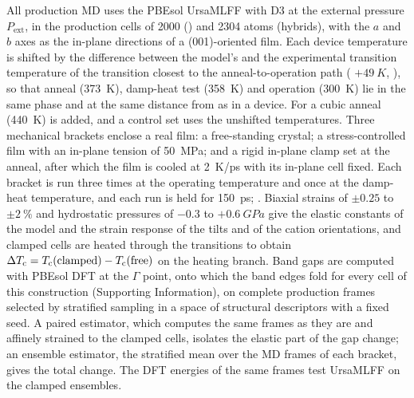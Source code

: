{All production MD uses the PBEsol UrsaMLFF with D3 at the external pressure $P_\mathrm{ext}$, in
the production cells of 2000 (\CsSnI{}) and 2304 atoms (hybrids), with the $a$ and $b$ axes as the
in-plane directions of a (001)-oriented film. Each device temperature is shifted by the difference
between the model's and the experimental transition temperature of the transition closest to the
anneal-to-operation path (\CsSnI{} $+\SI{49}{K}$, ),
so that anneal (\SI{373}{K}), damp-heat test (\SI{358}{K}) and operation (\SI{300}{K}) lie in the
same phase and at the same distance from \Tc{} as in a device.  For \CsSnI{} a cubic anneal
(\SI{440}{K}) is added, and a control set uses the unshifted temperatures. Three mechanical
brackets enclose a real film: a free-standing crystal; a stress-controlled film with an in-plane
tension of \SI{50}{MPa}; and a rigid in-plane clamp set at the anneal, after which the film is
cooled at \SI{2}{K/ps} with its in-plane cell fixed. Each bracket is run three times at the
operating temperature and once at the damp-heat temperature, and each run is held for
\SI{150}{ps}; . Biaxial strains of $\pm0.25$ to $\pm\SI{2}{\percent}$ and hydrostatic pressures of
$-0.3$ to $+\SI{0.6}{GPa}$ give the elastic constants of the model and the strain response of the
tilts and of the cation orientations, and clamped cells are heated through the transitions to
obtain $\Delta T_\mathrm{c} = T_\mathrm{c}(\mathrm{clamped}) - T_\mathrm{c}(\mathrm{free})$ on the heating branch. Band gaps are
computed with PBEsol DFT at the $\Gamma$ point, onto which the band edges fold for every cell of
this construction (Supporting Information), on complete production frames selected by stratified
sampling in a space of structural descriptors with a fixed seed. A paired estimator, which
computes the same frames as they are and affinely strained to the clamped cells, isolates the
elastic part of the gap change; an ensemble estimator, the stratified mean over the MD frames of
each bracket, gives the total change.  The DFT energies of the same frames test UrsaMLFF on the clamped ensembles.

}

